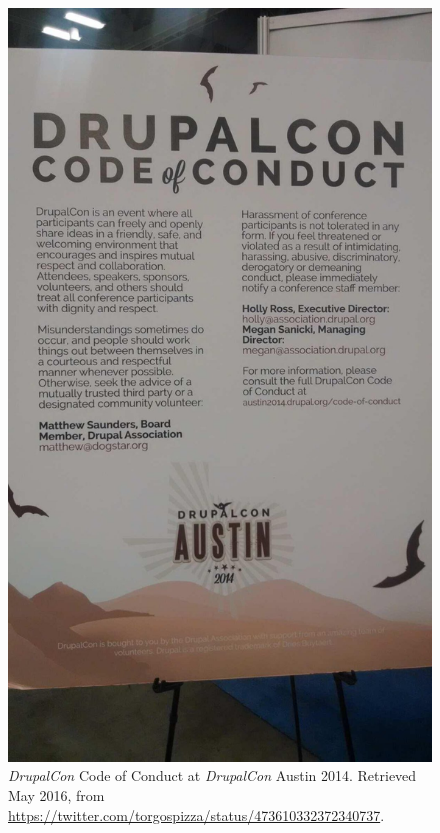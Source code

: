 \begin{figure}[H]
\centering
\includegraphics[scale=0.2]{img/offline/dcon_austin_coc.jpeg}
\caption[Picture from \textit{DrupalCon} Code of Conduct at \textit{DrupalCon} Austin 2014]%
{\textit{DrupalCon} Code of Conduct at \textit{DrupalCon} Austin 2014. Retrieved  May 2016, from \url{https://twitter.com/torgospizza/status/473610332372340737}.}
\label{dcon-coc}
\end{figure}


